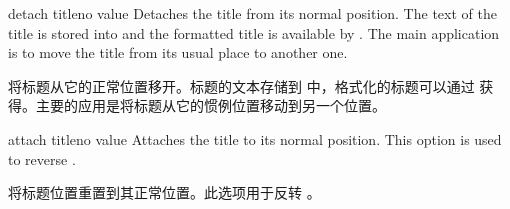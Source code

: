 \begin{docTcbKey}{detach title}{}{no value}
Detaches the title from its normal position. The text of the title is
stored into  and the formatted title is
available by .
The main application is to move the title from its usual place to another one.
  
将标题从它的正常位置移开。标题的文本存储到  中，格式化的标题可以通过  获得。主要的应用是将标题从它的惯例位置移动到另一个位置。

 
\end{docTcbKey}


  

\begin{docTcbKey}{attach title}{}{no value}
  Attaches the title to its normal position. This option is used to reverse
  .

  将标题位置重置到其正常位置。此选项用于反转 。
  \end{docTcbKey}
  
